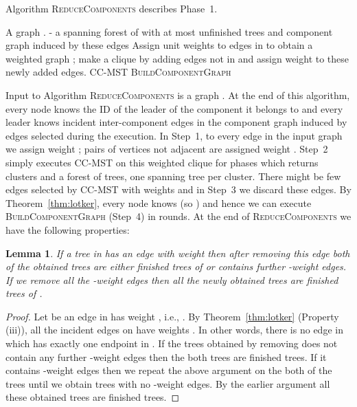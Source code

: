 \documentclass[11pt]{article}
\newtheorem{lemma}[theorem]{Lemma}
\begin{document}
Algorithm \textsc{ReduceComponents} describes Phase~1. 
\begin{algorithm}[H]
  \caption{Phase 1: \textsc{ReduceComponents} \label{algo:phase1}}
  \begin{algorithmic}[1]
    \REQUIRE A graph . 
    \ENSURE   - a spanning forest of  with at most  unfinished trees and component graph induced by these edges  
    \STATE   Assign unit weights to edges in  to obtain a weighted graph ; make  a clique by adding edges not in  and assign weight  to these newly added edges.  
    \STATE    \textsc{CC-MST}
    \STATE   
    \STATE  \textsc{BuildComponentGraph}
    \RETURN 
  \end{algorithmic}
\end{algorithm}
\noindent Input to Algorithm \textsc{ReduceComponents} is a graph . 
At the end of this algorithm, every node knows the ID of the leader of the component it belongs to and every leader knows incident inter-component edges in the component graph induced by edges selected during the execution. 
In Step~1, to every edge in the input graph  we assign weight ; pairs of vertices not adjacent are assigned weight . 
Step~2 simply executes \textsc{CC-MST} on this weighted clique for  phases which returns clusters  and a forest  of trees, one spanning tree per cluster. 
There might be few edges selected by \textsc{CC-MST} with weights  and in Step~3 we discard these edges. 
By Theorem~\ref{thm:lotker}, every node knows  (so ) and hence we can execute \textsc{BuildComponentGraph} (Step~4) in  rounds. 
At the end of \textsc{ReduceComponents} we have the following properties:
\begin{lemma}
  \label{lemma:phase1Finished}
 If a tree in  has an edge with weight  then after removing this edge both of the obtained trees are either finished trees of  or contains further -weight edges. If we remove all the -weight edges then all the newly obtained trees are finished trees of . 
\end{lemma}
\begin{proof}
  Let  be an edge in   has weight , i.e., .  
  By Theorem~\ref{thm:lotker} (Property (iii)), all the incident edges on  have weights .
  In other words, there is no edge in  which has exactly one endpoint in . 
  If the trees obtained by removing  does not contain any further -weight edges then the both trees are finished trees. 
  If it contains -weight edges then we repeat the above argument on the both of the trees until we obtain trees with no -weight edges.
  By the earlier argument all these obtained trees are finished trees. 
\end{proof}
\end{document}
